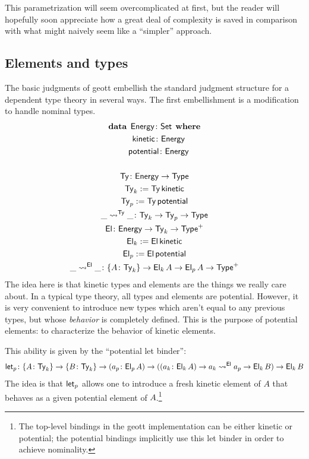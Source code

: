 \documentclass[fleqn,leqno]{article}
\begin{document}
This parametrization will seem overcomplicated at first, but the reader will hopefully soon appreciate how a great deal of complexity is saved in comparison with what might naively seem like a ``simpler'' approach.

\subsection{Elements and types}

The basic judgments of geott embellish the standard judgment structure for a dependent type theory in several ways. The first embellishment is a modification to handle nominal types.
\begin{gather}
  \mathbf{data} \:\: \mathsf{Energy}\colon \mathsf{Set} \:\: \mathbf{where} \\
  \quad \mathsf{kinetic} \colon \mathsf{Energy} \\
  \quad \mathsf{potential} \colon \mathsf{Energy} \\
  \\
  \mathsf{Ty} \colon \mathsf{Energy} \to \mathsf{Type} \\
  \mathsf{Ty}_k := \mathsf{Ty}\,\mathsf{kinetic} \\
  \mathsf{Ty}_p := \mathsf{Ty}\,\mathsf{potential} \\
  \_\rightsquigarrow^{\mathsf{Ty}}\_ \colon \mathsf{Ty}_k \to \mathsf{Ty}_p \to \mathsf{Type} \\
  \mathsf{El} \colon \mathsf{Energy} \to \mathsf{Ty}_k \to \mathsf{Type}^+ \\
  \mathsf{El}_k := \mathsf{El}\,\mathsf{kinetic} \\
  \mathsf{El}_p := \mathsf{El}\,\mathsf{potential} \\
  \_\rightsquigarrow^{\mathsf{El}}\_ \colon \{A \colon \mathsf{Ty}_k\} \to \mathsf{El}_k\,A \to \mathsf{El}_p\,A \to \mathsf{Type}^+
\end{gather}
The idea here is that kinetic types and elements are the things we really care about. In a typical type theory, all types and elements are potential. However, it is very convenient to introduce new types which aren't equal to any previous types, but whose \emph{behavior} is completely defined. This is the purpose of potential elements: to characterize the behavior of kinetic elements.

This ability is given by the ``potential let binder'':
\begin{gather}
  \mathsf{let}_p \colon \{A \colon \mathsf{Ty}_k\} \to \{B \colon \mathsf{Ty}_k\} \to (a_p \colon \mathsf{El}_p\,A) \to ((a_k \colon \mathsf{El}_k\,A) \to a_k \rightsquigarrow^{\mathsf{El}} a_p \to \mathsf{El}_k\,B) \to \mathsf{El}_k\,B
\end{gather}
The idea is that $\mathsf{let}_p$ allows one to introduce a fresh kinetic element of $A$ that behaves as a given potential element of $A$.\footnote{The top-level bindings in the geott implementation can be either kinetic or potential; the potential bindings implicitly use this let binder in order to achieve nominality.}
\end{document}
